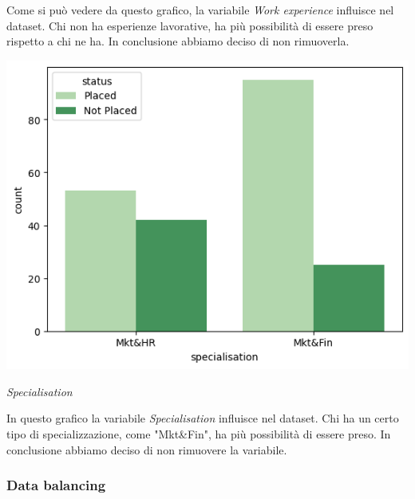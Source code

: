 \documentclass[12pt]{article}
\begin{document}
Come si può vedere da questo grafico, la variabile \textit{Work experience} influisce nel dataset. Chi non ha esperienze lavorative, ha più possibilità di essere preso rispetto a chi ne ha.
In conclusione abbiamo deciso di non rimuoverla.
\begin{center}
    \includegraphics[scale=0.5]{specialisation.png}

    \textit{Specialisation}
\end{center}
In questo grafico la variabile \textit{Specialisation} influisce nel dataset. Chi ha un certo tipo di specializzazione, come "Mkt\&Fin", ha più possibilità di essere preso.
In conclusione abbiamo deciso di non rimuovere la variabile.


\subsubsection{Data balancing}
\end{document}
